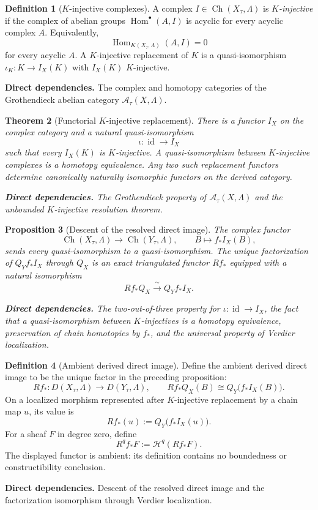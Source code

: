 \documentclass[10pt]{article}
\newtheorem{theorem}{Theorem}[section]
\newtheorem{proposition}[theorem]{Proposition}
\theoremstyle{definition}
\newtheorem{definition}[theorem]{Definition}
\newcommand{\Hom}{\operatorname{Hom}}
\newcommand{\deps}[1]{\par\smallskip\noindent\textbf{Direct dependencies.} #1}
\begin{document}
\begin{definition}[$K$-injective complexes]
A complex $I\in\operatorname{Ch}(X_\tau,\Lambda)$ is \emph{$K$-injective}
if the complex of abelian groups $\Hom^\bullet(A,I)$ is acyclic for every
acyclic complex $A$.  Equivalently,
\[
 \Hom_{K(X_\tau,\Lambda)}(A,I)=0
\]
for every acyclic $A$.  A $K$-injective replacement of $K$ is a
quasi-isomorphism $\iota_K:K\to I_X(K)$ with $I_X(K)$ $K$-injective.
\deps{The complex and homotopy categories of the Grothendieck abelian
category $\mathcal A_\tau(X,\Lambda)$.}
\end{definition}

\begin{theorem}[Functorial $K$-injective replacement]
There is a functor $I_X$ on the complex category and a natural
quasi-isomorphism
\[
 \iota:\operatorname{id}\longrightarrow I_X
\]
such that every $I_X(K)$ is $K$-injective.  A quasi-isomorphism between
$K$-injective complexes is a homotopy equivalence.  Any two such replacement
functors determine canonically naturally isomorphic functors on the derived
category.
\deps{The Grothendieck property of $\mathcal A_\tau(X,\Lambda)$ and the
unbounded $K$-injective resolution theorem.}
\end{theorem}

\begin{proposition}[Descent of the resolved direct image]
The complex functor
\[
 \operatorname{Ch}(X_\tau,\Lambda)\longrightarrow
 \operatorname{Ch}(Y_\tau,\Lambda),
 \qquad B\longmapsto f_*I_X(B),
\]
sends every quasi-isomorphism to a quasi-isomorphism.  The unique
factorization of $Q_Yf_*I_X$ through $Q_X$ is an exact triangulated functor
$Rf_*$ equipped with a natural isomorphism
\[
 Rf_*Q_X\xrightarrow{\ \sim\ }Q_Yf_*I_X.
\]
\deps{The two-out-of-three property for $\iota:\operatorname{id}\to I_X$,
the fact that a quasi-isomorphism between $K$-injectives is a homotopy
equivalence, preservation of chain homotopies by $f_*$, and the universal
property of Verdier localization.}
\end{proposition}

\begin{definition}[Ambient derived direct image]
Define the ambient derived direct image to be the unique factor in the
preceding proposition:
\[
 Rf_*:D(X_\tau,\Lambda)\longrightarrow D(Y_\tau,\Lambda),
 \qquad
 Rf_*Q_X(B)\cong Q_Y\bigl(f_*I_X(B)\bigr).
\]
On a localized morphism represented after $K$-injective replacement by a
chain map $u$, its value is
\[
 Rf_*(u):=Q_Y\bigl(f_*I_X(u)\bigr).
\]
For a sheaf $F$ in degree zero, define
\[
 R^qf_*F:=\mathcal H^q(Rf_*F).
\]
The displayed functor is ambient: its definition contains no boundedness or
constructibility conclusion.
\deps{Descent of the resolved direct image and the factorization isomorphism
through Verdier localization.}
\end{definition}
\end{document}
